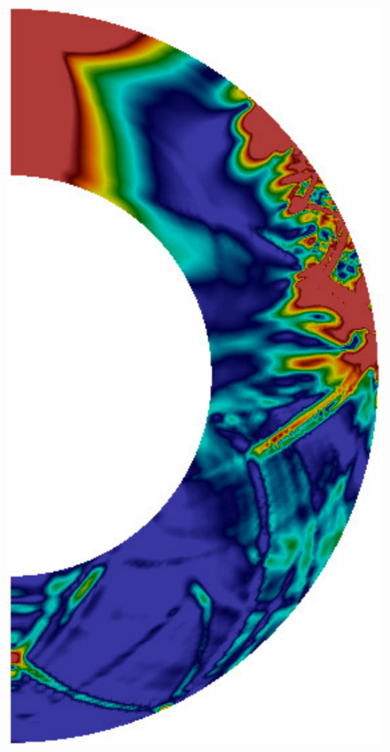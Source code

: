 \documentclass[extra,referee]{gji}
\begin{document}
\begin{figure}
\begin{minipage}{0.6\textwidth}
\begin{minipage}{.585\textwidth}
      \label{fig:1deq}  
    \end{minipage}
    \begin{minipage}{.39\textwidth}
      \centering
      \includegraphics[height=1.35\textwidth]{fig/snapshot/1d-slice.pdf}
      \label{fig:1dsl}    
    \end{minipage}\\
    \begin{minipage}{.585\textwidth}
      \centering
      \vspace{1em}

\end{minipage}
\end{minipage}
\end{figure}
\end{document}
